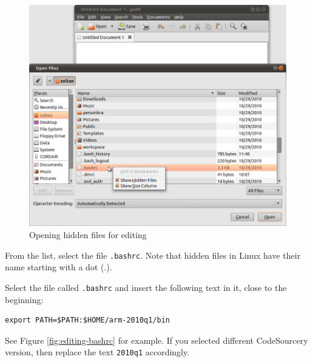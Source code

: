 \documentclass[a4paper, 10pt]{article}
\begin{document}
    \begin{figure}[H]
    \centering
        \includegraphics[width=\textwidth]{./png-install-guide/show-all-files.png}
        \caption{Opening hidden files for editing}
        \label{fig:show-hidden-files}
    \end{figure}

From the list, select the file \verb+.bashrc+. Note that hidden files in Linux
have their name starting with a dot (.).

Select the file called \verb+.bashrc+ and insert the following text in it, 
close to the beginning:

\begin{verbatim}
export PATH=$PATH:$HOME/arm-2010q1/bin
\end{verbatim}

See Figure \ref{fig:editing-bashrc} for example. If you selected different CodeSourcery version,
then replace the text \verb+2010q1+ accordingly.
\end{document}
